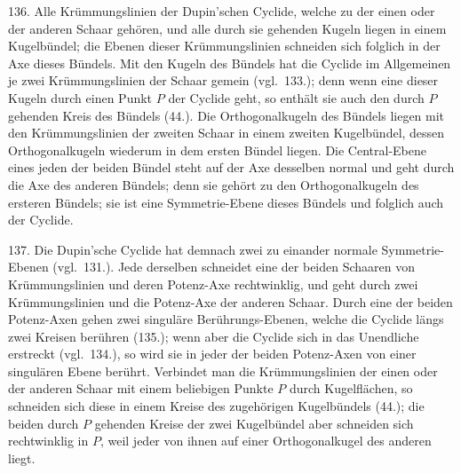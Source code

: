 136. Alle Kr\"ummungslinien der Dupin'schen Cyclide,
welche zu der einen oder der anderen Schaar geh\"oren, und
alle durch sie gehenden Kugeln liegen in einem Kugelb\"undel;
die Ebenen dieser Kr\"ummungslinien schneiden sich folglich
in der Axe dieses B\"undels. Mit den Kugeln des B\"undels
hat die Cyclide im Allgemeinen je zwei Kr\"ummungslinien
der Schaar gemein (vgl.\ 133.); denn wenn eine dieser Kugeln
durch einen Punkt $P$ der Cyclide geht, so enth\"alt sie auch
den durch $P$ gehenden Kreis des B\"undels (44.). Die Orthogonalkugeln
des B\"undels liegen mit den Kr\"ummungslinien
der zweiten Schaar in einem zweiten Kugelb\"undel, dessen
Orthogonalkugeln wiederum in dem ersten B\"undel liegen.
Die Central-Ebene eines jeden der beiden B\"undel steht auf
der Axe desselben normal und geht durch die Axe des anderen
B\"undels; denn sie geh\"ort zu den Orthogonalkugeln des ersteren
B\"undels; sie ist eine Symmetrie-Ebene dieses B\"undels und
folglich auch der Cyclide.

137. Die Dupin'sche Cyclide hat demnach zwei zu einander
normale Symmetrie-Ebenen (vgl.\ 131.). Jede derselben
schneidet eine der beiden Schaaren von Kr\"ummungslinien
und deren Potenz-Axe rechtwinklig, und geht durch zwei
Kr\"ummungslinien und die Potenz-Axe der anderen Schaar.
Durch eine der beiden Potenz-Axen gehen zwei singul\"are
Ber\"uhrungs-Ebe\-nen, welche die Cyclide l\"angs zwei Kreisen ber\"uhren
(135.); wenn aber die Cyclide sich in das Unendliche
erstreckt (vgl.\ 134.), so wird sie in jeder der beiden Potenz-Axen
von einer singul\"aren Ebene ber\"uhrt. Verbindet man
die Kr\"ummungslinien der einen oder der anderen Schaar mit
einem beliebigen Punkte $P$ durch Kugelfl\"achen, so schneiden
sich diese in einem Kreise des zugeh\"origen Kugelb\"undels (44.);
die beiden durch $P$ gehenden Kreise der zwei Kugelb\"undel
aber schneiden sich rechtwinklig in $P$, weil jeder von ihnen
auf einer Orthogonalkugel des anderen liegt.

